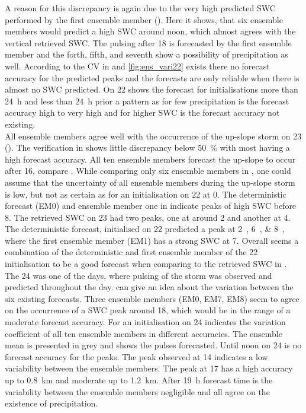 A reason for this discrepancy is again due to the very high predicted SWC performed by the first ensemble member (). Here it shows, that six ensemble members would predict a high SWC around noon, which almost agrees with the vertical retrieved SWC. The pulsing after \SI{18}{\UTC} is forecasted by the first ensemble member and the forth, fifth, and seventh show a possibility of precipitation as well. 
According to the CV in  and \ref{fig:ens_vari22} exists there no forecast accuracy for the predicted peaks and the forecasts are only reliable when there is almost no SWC predicted. On \SI{22}{\dec} shows the forecast for initialisations more than \SI{24}{\hour} and less than \SI{24}{\hour} prior a pattern as for few precipitation is the forecast accuracy high to very high and for higher SWC is the forecast accuracy not existing. 
\\
All ensemble members agree well with the occurrence of the up-slope storm on \SI{23}{\dec} (). The verification in  shows little discrepancy below \SI{50}{\percent} with most having a high forecast accuracy. All ten ensemble members forecast the up-slope to occur after \SI{16}{\UTC}, compare . While comparing only six ensemble members in , one could assume that the uncertainty of all ensemble members during the up-slope storm is low, but not as certain as for an initialisation on \SI{22}{\dec} at \SI{0}{\UTC}. 
The deterministic forecast (EM0) and ensemble member one in  indicate peaks of high SWC before \SI{8}{\UTC}. The retrieved SWC on \SI{23}{\dec} had two peaks, one at around \SI{2}{\UTC} and another at \SI{4}{\UTC}. The deterministic forecast, initialised on \SI{22}{\dec} predicted a peak at \SIlist{2;6;8}{\UTC}, where the first ensemble member (EM1) has a strong SWC at \SI{7}{\UTC}. Overall seems a combination of the deterministic and first ensemble member of the  \SI{22}{\dec} initialisation to be a good forecast when comparing to the retrieved SWC in .
\\
The \SI{24}{\dec} was one of the days, where pulsing of the storm was observed and predicted throughout the day. 
 can give an idea about the variation between the six existing forecasts. Three ensemble members (EM0, EM7, EM8) seem to agree on the occurrence of a SWC peak around \SI{18}{\UTC}, which would be in the range of a moderate forecast accuracy. 
For an initialisation on \SI{24}{\dec} indicates the variation coefficient of all ten ensemble members in  different accuracies. The ensemble mean is presented in grey and shows the pulses forecasted. Until noon on \SI{24}{\dec} is no forecast accuracy for the peaks. The peak observed at \SI{14}{\UTC} indicates a low variability between the ensemble members. The peak at \SI{17}{\UTC} has a high accuracy up to \SI{0.8}{\km} and moderate up to \SI{1.2}{\km}. After \SI{19}{\hour} forecast time is the variability between the ensemble members negligible and all agree on the existence of precipitation.
